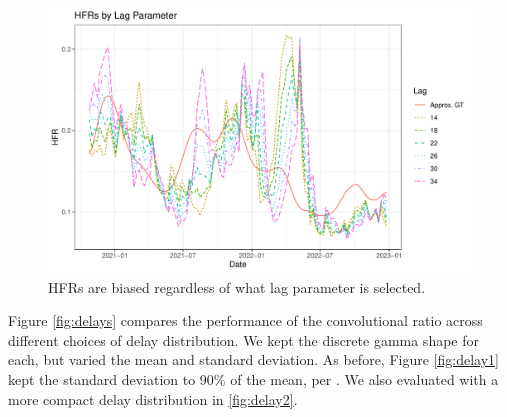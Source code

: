 \documentclass{article}
\begin{document}
\begin{figure}
    \centering
    \includegraphics[width=0.7\linewidth]{Figs/Real/hfrs_by_lag.pdf}
    \caption{HFRs are biased regardless of what lag parameter is selected.}
    \label{fig:lag}
\end{figure}


Figure \ref{fig:delays} compares the performance of the convolutional ratio across different choices of delay distribution. We kept the discrete gamma shape for each, but varied the mean and standard deviation. As before, Figure \ref{fig:delay1} kept the standard deviation to 90\% of the mean, per \citet{UKdelay}. We also evaluated with a more compact delay distribution in \ref{fig:delay2}. 

\end{document}
